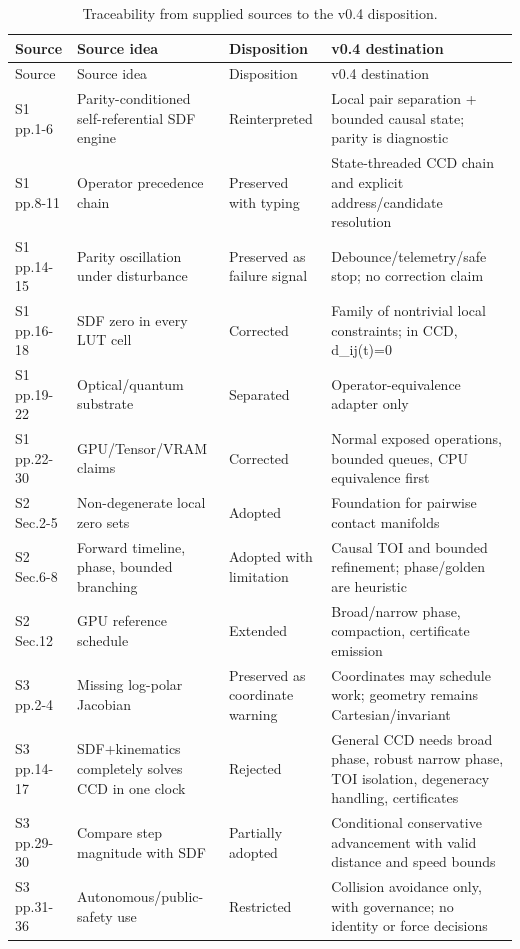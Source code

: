\small\begin{longtable}{@{}L{0.13\textwidth}L{0.23\textwidth}L{0.16\textwidth}L{0.38\textwidth}@{}}
\caption{Traceability from supplied sources to the v0.4 disposition.}\label{tab:traceability}\\
\toprule Source & Source idea & Disposition & v0.4 destination \\ \midrule
\endfirsthead
\toprule Source & Source idea & Disposition & v0.4 destination \\ \midrule
\endhead
S1 pp.1-6 & Parity-conditioned self-referential SDF engine & Reinterpreted & Local pair separation + bounded causal state; parity is diagnostic \\
S1 pp.8-11 & Operator precedence chain & Preserved with typing & State-threaded CCD chain and explicit address/candidate resolution \\
S1 pp.14-15 & Parity oscillation under disturbance & Preserved as failure signal & Debounce/telemetry/safe stop; no correction claim \\
S1 pp.16-18 & SDF zero in every LUT cell & Corrected & Family of nontrivial local constraints; in CCD, d\_ij(t)=0 \\
S1 pp.19-22 & Optical/quantum substrate & Separated & Operator-equivalence adapter only \\
S1 pp.22-30 & GPU/Tensor/VRAM claims & Corrected & Normal exposed operations, bounded queues, CPU equivalence first \\
S2 Sec.2-5 & Non-degenerate local zero sets & Adopted & Foundation for pairwise contact manifolds \\
S2 Sec.6-8 & Forward timeline, phase, bounded branching & Adopted with limitation & Causal TOI and bounded refinement; phase/golden are heuristic \\
S2 Sec.12 & GPU reference schedule & Extended & Broad/narrow phase, compaction, certificate emission \\
S3 pp.2-4 & Missing log-polar Jacobian & Preserved as coordinate warning & Coordinates may schedule work; geometry remains Cartesian/invariant \\
S3 pp.14-17 & SDF+kinematics completely solves CCD in one clock & Rejected & General CCD needs broad phase, robust narrow phase, TOI isolation, degeneracy handling, certificates \\
S3 pp.29-30 & Compare step magnitude with SDF & Partially adopted & Conditional conservative advancement with valid distance and speed bounds \\
S3 pp.31-36 & Autonomous/public-safety use & Restricted & Collision avoidance only, with governance; no identity or force decisions \\

\end{longtable}

